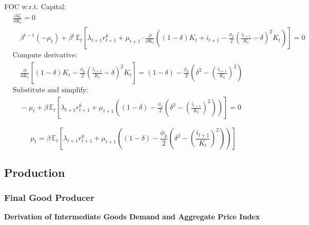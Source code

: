 \documentclass[11pt,preprint]{elsarticle}
\numberwithin{equation}{section}
\numberwithin{figure}{section}
\numberwithin{table}{section}
\begin{document}
FOC w.r.t. Capital: \begin{align*}
  & \frac{\partial \mathcal{L}}{\partial K_t} = 0 \\
  & \quad \beta^{t-1} (-\mu_t) + \beta^{t} \, \mathbb{E}_t \left[ \lambda_{t+1} r^k_{t+1} + \mu_{t+1} \cdot \frac{\partial}{\partial K_t} \left( (1-\delta) K_t + i_{t+1} - \frac{\phi_k}{2} \left( \frac{i_{t+1}}{K_t} - \delta \right)^2 K_t \right) \right] = 0 \\[6pt]
  & \text{Compute derivative:} \\
  & \quad \frac{\partial}{\partial K_t} \left[ (1-\delta) K_t - \frac{\phi_k}{2} \left( \frac{i_{t+1}}{K_t} - \delta \right)^2 K_t \right] = (1-\delta) - \frac{\phi_k}{2} \left( \delta^2 - \left( \frac{i_{t+1}}{K_t} \right)^2 \right) \\[6pt]
  & \text{Substitute and simplify:} \\
  & \quad -\mu_t + \beta \, \mathbb{E}_t \left[ \lambda_{t+1} r^k_{t+1} + \mu_{t+1} \left( (1-\delta) - \frac{\phi_k}{2} \left( \delta^2 - \left( \frac{i_{t+1}}{K_t} \right)^2 \right) \right) \right] = 0
\end{align*}

\begin{equation}\label{foc_K_app}
\boxed{\mu_t = \beta \, \mathbb{E}_t \left[ \lambda_{t+1} r^k_{t+1} + \mu_{t+1} \left( (1-\delta) - \frac{\phi_k}{2} \left( \delta^2 - \left( \frac{i_{t+1}}{K_t} \right)^2 \right) \right) \right]}
\end{equation}

\newpage

\subsection{Production}\label{production-1}

\subsubsection{\texorpdfstring{Final Good Producer
\label{final_good_producer_appendix}}{Final Good Producer }}\label{final-good-producer}

\textbf{Derivation of Intermediate Goods Demand and Aggregate Price
Index}
\end{document}
